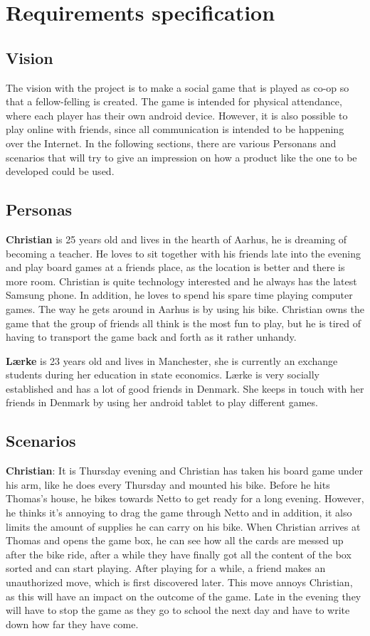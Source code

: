 \pagestyle{Uni}

\chapter{Requirements specification}

\section{Vision}
	The vision with the project is to make a social game that is played as co-op so that a fellow-felling is created.  The game is intended for physical attendance, where each player has their own android device. However, it is also possible to play online with friends, since all communication is intended to be happening over the Internet. In the following sections, there are various Personans and scenarios that will try to give an impression on how a product like the one to be developed could be used.


\section{Personas}
\textbf{Christian} is 25 years old and lives in the hearth of Aarhus, he is dreaming of becoming a teacher. He loves to sit together with his friends late into the evening and play board games at a friends place, as the location is better and there is more room. Christian is quite technology interested and he always has the latest Samsung phone. In addition, he loves to spend his spare time playing computer games. The way he gets around in Aarhus is by using his bike. Christian owns the game that the group of friends all think is the most fun to play, but he is tired of having to transport the game back and forth as it rather unhandy.

\textbf{Lærke} is 23 years old and lives in Manchester, she is currently an exchange students during her education in state economics. Lærke is very socially established and has a lot of good friends in Denmark. She keeps in touch with her friends in Denmark by using her android tablet to play different games.

\section{Scenarios}
\textbf{Christian}:
It is Thursday evening and Christian has taken his board game under his arm, like he does every Thursday and mounted his bike. Before he hits Thomas's house, he bikes towards Netto to get ready for a long evening. However, he thinks it's annoying to drag the game through Netto and in addition, it also limits the amount of supplies he can carry on his bike. When Christian arrives at Thomas and opens the game box, he can see how all the cards are messed up after the bike ride, after a while they have finally got all the content of the box sorted and can start playing. After playing for a while, a friend makes an unauthorized move, which is first discovered later. This move annoys Christian, as this will have an impact on the outcome of the game. Late in the evening they will have to stop the game as they go to school the next day and have to write down how far they have come.

